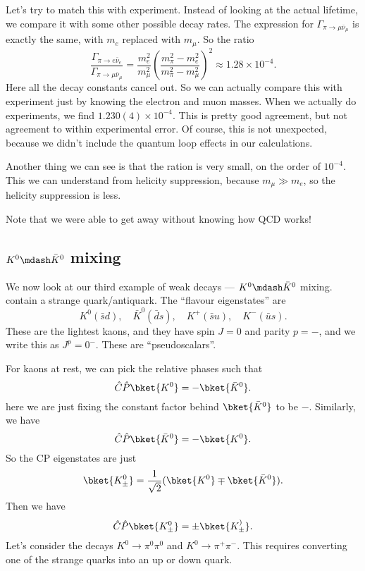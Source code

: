 \documentclass[a4paper]{article}
\begin{document}
Let's try to match this with experiment. Instead of looking at the actual lifetime, we compare it with some other possible decay rates. The expression for $\Gamma_{\pi \to \mu \bar{\nu}_\mu}$ is exactly the same, with $m_e$ replaced with $m_\mu$. So the ratio
\[
  \frac{\Gamma_{\pi \to e\bar{\nu}_e}}{\Gamma_{\pi \to \mu \bar{\nu}_\mu}} = \frac{m_e^2}{m_\mu^2} \left(\frac{m_\pi^2 - m_e^2}{m_\pi^2 - m_\mu^2}\right)^2 \approx 1.28 \times 10^{-4}.
\]
Here all the decay constants cancel out. So we can actually compare this with experiment just by knowing the electron and muon masses. When we actually do experiments, we find $1.230(4) \times 10^{-4}$. This is pretty good agreement, but not agreement to within experimental error. Of course, this is not unexpected, because we didn't include the quantum loop effects in our calculations.

Another thing we can see is that the ration is very small, on the order of $10^{-4}$. This we can understand from helicity suppression, because $m_\mu \gg m_e$, so the helicity suppression is less.

Note that we were able to get away without knowing how QCD works!

\subsection{\texorpdfstring{$K^0\mdash \bar{K}^0$}{K0-K0} mixing}
We now look at our third example of weak decays --- $K^0 \mdash \bar{K}^0$ mixing.  contain a strange quark/antiquark. The ``flavour eigenstates'' are
\[
  K^0  (\bar{s} d),\quad \bar{K}^0  (\bar{d} s),\quad K^+(\bar{s} u),\quad K^-(\bar{u} s).
\]
These are the lightest kaons, and they have spin $J = 0$ and parity $p = -$, and we write this as $J^p = 0^-$. These are ``pseudoscalars''.

For kaons at rest, we can pick the relative phases such that
\[
  \hat{C} \hat{P} \bket{K^0} = - \bket{\bar{K}^0}.
\]
here we are just fixing the constant factor behind $\bket{\bar{K}^0}$ to be $-$. Similarly, we have
\[
  \hat{C} \hat{P} \bket{\bar{K}^0} = - \bket{K^0}.
\]
So the CP eigenstates are just
\[
  \bket{K_\pm^0} = \frac{1}{\sqrt{2}} (\bket{K^0} \mp \bket{\bar{K}^0}).
\]
Then we have
\[
  \hat{C}\hat{P} \bket{K_{\pm}^0} = \pm \bket{K_{\pm}^)}.
\]
Let's consider the decays $K^0 \to \pi^0 \pi^0$ and $K^0 \to \pi^+ \pi^-$. This requires converting one of the strange quarks into an up or down quark.
%
\end{document}
